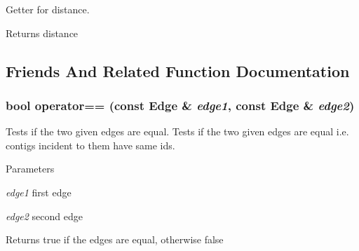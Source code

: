 Getter for distance. \begin{DoxyReturn}{Returns}
distance 
\end{DoxyReturn}


\subsection{Friends And Related Function Documentation}
\hypertarget{classEdge_a49b989380f52aa039eca454b851cfe88}{
\subsubsection[{operator==}]{\setlength{\rightskip}{0pt plus 5cm}bool operator== (const {\bf Edge} \& {\em edge1}, \/  const {\bf Edge} \& {\em edge2})}}
\label{classEdge_a49b989380f52aa039eca454b851cfe88}


Tests if the two given edges are equal. Tests if the two given edges are equal i.e. contigs incident to them have same ids.


\begin{DoxyParams}{Parameters}
\item[{\em edge1}]first edge \item[{\em edge2}]second edge \end{DoxyParams}
\begin{DoxyReturn}{Returns}
true if the edges are equal, otherwise false 
\end{DoxyReturn}


